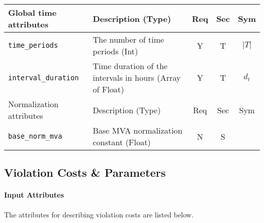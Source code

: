 \documentclass{article}
\begin{document}
\begin{center}
\small
\begin{tabular}{ l | l | c | c | c |}
Global time attributes & Description (Type) & Req & Sec & Sym\\
\hline
  {\tt time\_periods} & The number of time periods (Int) & Y & T & $\lvert T \rvert$ \\
  {\tt interval\_duration} & Time duration of the intervals in hours (Array of Float) & Y & T & $d_t$ \\
\hline
Normalization attributes & Description (Type) & Req & Sec & Sym\\
\hline  
{\tt base\_norm\_mva} & Base MVA normalization constant (Float)  & N & S &  \\
  \hline
\end{tabular}
\end{center}

\subsection{Violation Costs \& Parameters}
\label{nom:violation}
\paragraph{Input Attributes} The attributes for describing violation costs are listed below.
\end{document}
